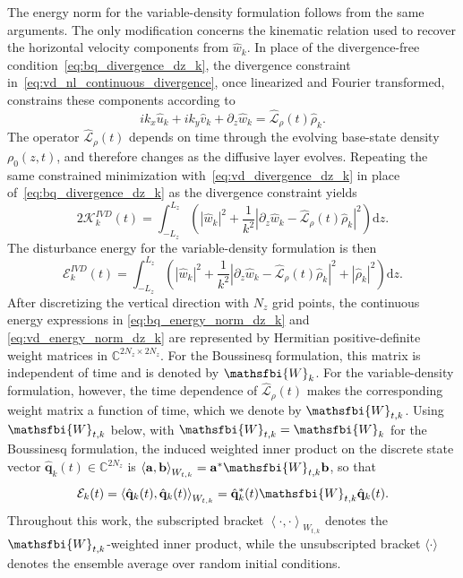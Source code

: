 The energy norm for the variable-density formulation follows from the same arguments. The only modification concerns the kinematic relation used to recover the horizontal velocity components from \(\hat{w}_k\). In place of the divergence-free condition~\eqref{eq:bq_divergence_dz_k}, the divergence constraint in~\eqref{eq:vd_nl_continuous_divergence}, once linearized and Fourier transformed, constrains these components according to
\begin{equation}
    \label{eq:vd_divergence_dz_k}
    ik_{x}\hat{u}_k+ik_{y}\hat{v}_k+\partial_{z}\hat{w}_k = \widehat{\mathscr{L}}_{\rho}(t)\hat{\rho}_k.
\end{equation}
The operator \(\widehat{\mathscr{L}}_{\rho}(t)\) depends on time through the evolving base-state density \(\rho_0(z,t)\), and therefore changes as the diffusive layer evolves.
Repeating the same constrained minimization with~\eqref{eq:vd_divergence_dz_k} in place of~\eqref{eq:bq_divergence_dz_k} as the divergence constraint yields
\begin{equation}
    \label{eq:vd_kinetic_energy_reduced_dz_k}
    2\mathcal{K}_k^{IVD}(t) = \int_{-L_z}^{L_z}\left(|\hat{w}_k|^{2}+\frac{1}{k^{2}}\left|\partial_{z}\hat{w}_k-\widehat{\mathscr{L}}_{\rho}(t)\hat{\rho}_k\right|^{2}\right)\mathrm{d}z.
\end{equation}
The disturbance energy for the variable-density formulation is then
\begin{equation}
    \label{eq:vd_energy_norm_dz_k}
    \mathcal{E}_k^{IVD}(t) = \int_{-L_z}^{L_z}\left(|\hat{w}_k|^{2}+\frac{1}{k^{2}}\left|\partial_{z}\hat{w}_k-\widehat{\mathscr{L}}_{\rho}(t)\hat{\rho}_k\right|^{2}+|\hat{\rho}_k|^{2}\right)\mathrm{d}z.
\end{equation}
After discretizing the vertical direction with \(N_z\) grid points, the continuous energy expressions in \eqref{eq:bq_energy_norm_dz_k} and \eqref{eq:vd_energy_norm_dz_k} are represented by Hermitian positive-definite weight matrices in \(\mathbb{C}^{2N_z\times 2N_z}\). For the Boussinesq formulation, this matrix is independent of time and is denoted by \(\mathsfbi{W}_{k}\). For the variable-density formulation, however, the time dependence of \(\widehat{\mathscr{L}}_{\rho}(t)\) makes the corresponding weight matrix a function of time, which we denote by \(\mathsfbi{W}_{t,k}\). Using \(\mathsfbi{W}_{t,k}\) below, with \(\mathsfbi{W}_{t,k}=\mathsfbi{W}_{k}\) for the Boussinesq formulation, the induced weighted inner product on the discrete state vector \(\hat{\mathbf{q}}_k(t)\in\mathbb{C}^{2N_z}\) is \(\left\langle\mathbf{a},\mathbf{b}\right\rangle_{W_{t,k}}=\mathbf{a}^{*}\mathsfbi{W}_{t,k}\mathbf{b}\), so that
\begin{equation}
    \mathcal{E}_k(t)
    =
    \left\langle\hat{\mathbf{q}}_k(t),\hat{\mathbf{q}}_k(t)\right\rangle_{W_{t,k}}
    =
    \hat{\mathbf{q}}_k^{*}(t)\mathsfbi{W}_{t,k}\hat{\mathbf{q}}_k(t).
    \label{eq:instantaneous_energy}
\end{equation}
Throughout this work, the subscripted bracket \(\left\langle\cdot,\cdot\right\rangle_{W_{t,k}}\) denotes the \(\mathsfbi{W}_{t,k}\)-weighted inner product, while the unsubscripted bracket \(\langle\cdot\rangle\) denotes the ensemble average over random initial conditions.

